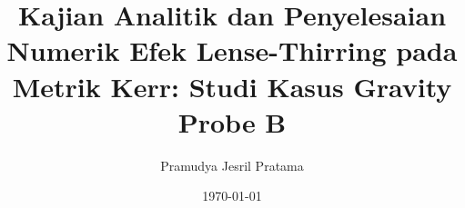 



\title{\textbf{Kajian Analitik dan Penyelesaian Numerik Efek Lense-Thirring pada Metrik Kerr: Studi Kasus Gravity Probe B}}
\author{Pramudya Jesril Pratama}
\date{\today}





\setcounter{page}{2}

\tableofcontents
\listoffigures
\listoftables

\cleardoublepage
{}
\setcounter{page}{1}









\printbibliography


